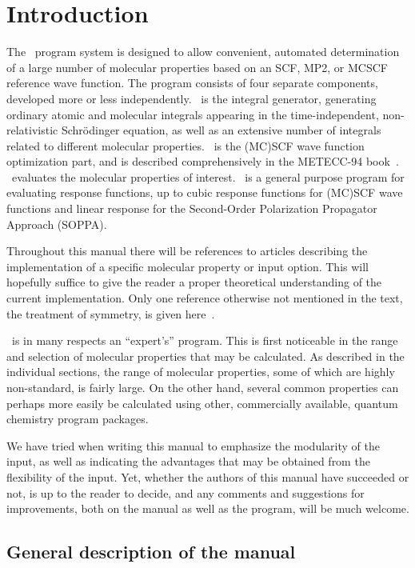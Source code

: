 \chapter{Introduction}\label{ch:intro}

          The \siraba\ program system is designed to allow
convenient, automated determination of a large number of molecular
properties based on an SCF, MP2, or MCSCF reference wave function.
 The program consists
of four separate components, developed more or less independently.
\her\ is the integral generator, generating ordinary
atomic and molecular integrals appearing
in the time-independent, non-relativistic Schr\"{o}dinger
equation, as well as an extensive number of integrals related to
different molecular properties. \sir\ is the (MC)SCF wave function
optimization part, and is described comprehensively in the
METECC-94 book~\cite{hjajhajomotecc}. \aba\ evaluates the
molecular properties of interest. \resp\ is a general purpose
program for evaluating response functions, up to cubic response
functions for (MC)SCF wave functions and linear response for the
Second-Order Polarization Propagator Approach (SOPPA).

Throughout this manual there will be references to articles
describing the implementation of a specific molecular property or
input option. This will hopefully suffice to give the reader a proper
theoretical understanding of the current implementation. Only one
reference otherwise not mentioned in the text, the treatment of
symmetry, is given here~\cite{prttca69}.

\siraba\ is in many respects an ``expert's'' program. This is first
noticeable in the range and selection of molecular properties that may
be calculated. As described in the individual sections, the range of
molecular properties, some of which are highly non-standard, is fairly
large. On the other hand, several common properties can perhaps more
easily be calculated using other, commercially available, quantum
chemistry program packages.

We have tried when writing this manual to emphasize the modularity of
the input, as well as indicating  the advantages that may be obtained from
the flexibility of the input. Yet, whether the authors of
this manual have succeeded or not, is up to the reader to decide, and
any comments and suggestions for improvements, both on the manual as
well as the program, will be much welcome.

\section{General description of the manual}

